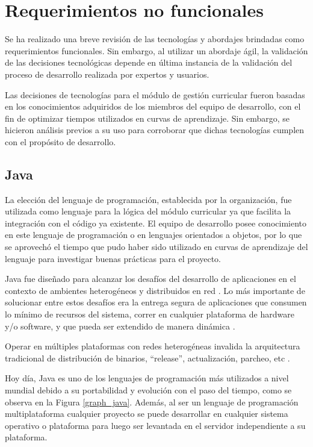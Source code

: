 \section{Requerimientos no funcionales} \label{reqnofuncional}
Se ha realizado una breve revisión de las tecnologías y abordajes brindadas como requerimientos funcionales. Sin embargo, al utilizar un abordaje ágil, la validación de las decisiones tecnológicas depende en última instancia de la validación del proceso de desarrollo realizada por expertos y usuarios.

Las decisiones de tecnologías para el módulo de gestión curricular fueron basadas en los conocimientos adquiridos de los miembros del equipo de desarrollo, con el fin de optimizar tiempos utilizados en curvas de aprendizaje. Sin embargo, se hicieron análisis previos a su uso para corroborar que dichas tecnologías cumplen con el propósito de desarrollo.

\subsection{Java}
La elección del lenguaje de programación, establecida por la organización, fue utilizada como lenguaje para la lógica del módulo curricular ya que facilita la integración con el código ya existente. El equipo de desarrollo posee conocimiento en este lenguaje de programación o en lenguajes orientados a objetos, por lo que se aprovechó el tiempo que pudo haber sido utilizado en curvas de aprendizaje del lenguaje para investigar buenas prácticas para el proyecto.

Java fue diseñado para alcanzar los desafíos del desarrollo de aplicaciones en el contexto de ambientes heterogéneos y distribuidos en red \citep{eckel_thinking_2006}. Lo más importante de solucionar entre estos desafíos era la entrega segura de aplicaciones que consumen lo mínimo de recursos del sistema, correr en cualquier plataforma de hardware y/o software, y que pueda ser extendido de manera dinámica \citep{sierra2005head}.

Operar en múltiples plataformas con redes heterogéneas invalida la arquitectura tradicional de distribución de binarios, \enquote{release}, actualización, parcheo, etc \citep{arnold2005java}.

Hoy día, Java es uno de los lenguajes de programación más utilizados a nivel mundial debido a su portabilidad y evolución con el paso del tiempo, como se observa en la Figura \ref{graph_java}. Además, al ser un lenguaje de programación multiplataforma cualquier proyecto se puede desarrollar en cualquier sistema operativo o plataforma para luego ser levantada en el servidor independiente a su plataforma. 

